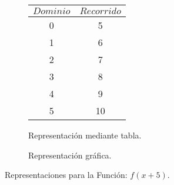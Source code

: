 \begin{figure}[h]
\centering
\begin{subfigure}[A]{0.3\textwidth}
\centering
\begin{tabular}{c|c}
$Dominio$ & $Recorrido$ \\ \hline
\hline
0 & 5 \\ \hline
1 & 6 \\ \hline
2 & 7 \\ \hline
3 & 8 \\ \hline
4 & 9 \\ \hline
5 & 10 \\ \hline
\end{tabular} 
\caption{Representación mediante tabla.}

\end{subfigure}%
\quad
\begin{subfigure}[B]{0.3\textwidth}
\centering



\caption{Representación gráfica.}

\end{subfigure}

\caption{Representaciones para la Función: $f(x+5)$.}

\end{figure}

